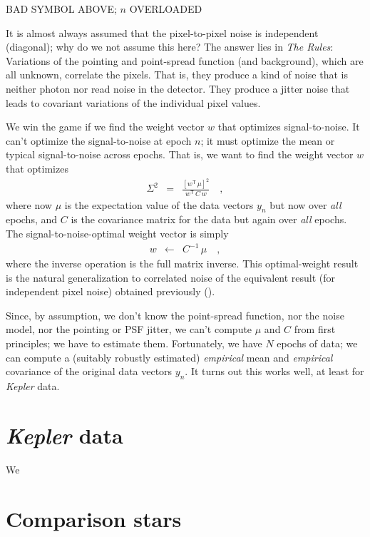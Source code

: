 \documentclass[12pt, letterpaper, preprint]{aastex}
\newcommand{\project}[1]{\textsl{#1}}
\newcommand{\transpose}[1]{{#1}^{\!\mathsf T}}
\newcommand{\inverse}[1]{{#1}^{-1}}
\begin{document}
BAD SYMBOL ABOVE; $n$ OVERLOADED

It is almost always assumed that the pixel-to-pixel noise is independent (diagonal);
  why do we not assume this here?
The answer lies in \emph{The Rules}:
Variations of the pointing and point-spread function (and background),
  which are all unknown,
  correlate the pixels.
That is, they produce a kind of noise that is neither photon nor read noise in the detector.
They produce a jitter noise that leads to covariant variations of the individual pixel values.

We win the game if we find the weight vector $w$ that optimizes signal-to-noise.
It can't optimize the signal-to-noise at epoch $n$;
  it must optimize the mean or typical signal-to-noise across epochs.
That is, we want to find the weight vector $w$ that optimizes
\begin{eqnarray}
\Sigma^2 &=& \frac{[\transpose{w}\, \mu]^2}{\transpose{w}\, C\, w}
\quad ,
\end{eqnarray}
where now $\mu$ is the expectation value of the data vectors $y_n$ but now over \emph{all} epochs,
  and $C$ is the covariance matrix for the data but again over \emph{all} epochs.
The signal-to-noise-optimal weight vector is simply
\begin{eqnarray}
w &\leftarrow& \inverse{C}\, \mu
\quad ,
\end{eqnarray}
  where the inverse operation is the full matrix inverse.
This optimal-weight result is the natural generalization to correlated noise
  of the equivalent result (for independent pixel noise)
  obtained previously (\citealt{naylor}).

Since, by assumption, we don't know the point-spread function,
  nor the noise model,
  nor the pointing or PSF jitter,
  we can't compute $\mu$ and $C$ from first principles; we have to estimate them.
Fortunately, we have $N$ epochs of data;
  we can compute a (suitably robustly estimated)
  \emph{empirical} mean and \emph{empirical} covariance
  of the original data vectors $y_n$.
It turns out this works well, at least for \project{Kepler} data.

\section{\project{Kepler} data}

We 

\section{Comparison stars}
\end{document}
